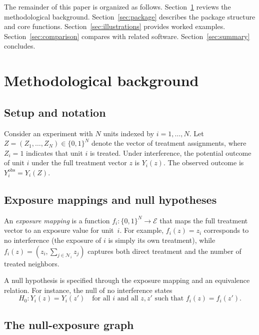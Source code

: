 \documentclass[article]{jss}
\begin{document}
The remainder of this paper is organized as follows.
Section~\ref{sec:method} reviews the methodological background.
Section~\ref{sec:package} describes the package structure and core
functions. Section~\ref{sec:illustrations} provides worked examples.
Section~\ref{sec:comparison} compares  with related
software. Section~\ref{sec:summary} concludes.



\section{Methodological background} \label{sec:method}

\subsection{Setup and notation}

Consider an experiment with $N$ units indexed by $i = 1, \ldots, N$.  Let
$Z = (Z_1, \ldots, Z_N) \in \{0,1\}^N$ denote the vector of treatment
assignments, where $Z_i = 1$ indicates that unit $i$ is treated.  Under
interference, the potential outcome of unit $i$ under the full treatment
vector $z$ is $Y_i(z)$.  The observed outcome is $Y_i^{\text{obs}} =
Y_i(Z)$.

\subsection{Exposure mappings and null hypotheses}

An \emph{exposure mapping} is a function $f_i: \{0,1\}^N \to
\mathcal{E}$ that maps the full treatment vector to an exposure value for
unit~$i$.  For example, $f_i(z) = z_i$ corresponds to no interference
(the exposure of $i$ is simply its own treatment), while $f_i(z) = (z_i,
\sum_{j \in \mathcal{N}_i} z_j)$ captures both direct treatment and the
number of treated neighbors.

A null hypothesis is specified through the exposure mapping and an
equivalence relation.  For instance, the null of no interference states
\[
  H_0: Y_i(z) = Y_i(z') \quad \text{for all } i \text{ and all } z, z'
  \text{ such that } f_i(z) = f_i(z').
\]

\subsection{The null-exposure graph}
\end{document}
